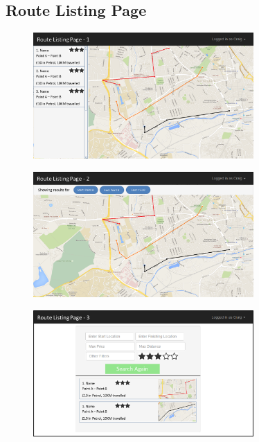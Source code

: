 \newpage 
\subsection{Route Listing Page}
\begin{figure}[!ht]
	\begin{center}
		\includegraphics[width=0.75\textwidth]{images/appendix/rlp1.png}
	\end{center}
	\vspace{-6mm}
\end{figure}

\begin{figure}[!ht]
	\begin{center}
		\includegraphics[width=0.75\textwidth]{images/appendix/rlp2.png}
	\end{center}
	\vspace{-6mm}
\end{figure}

\begin{figure}[!ht]
	\begin{center}
		\includegraphics[width=0.75\textwidth]{images/appendix/rlp3.png}
	\end{center}
	\vspace{-6mm}
\end{figure}

